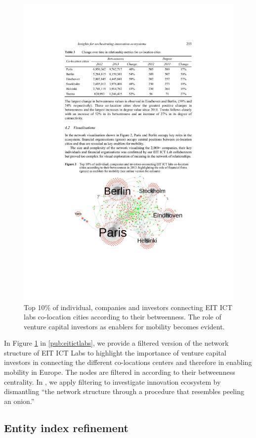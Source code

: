 \begin{figure}[htb]
\centering
\includegraphics[width=12cm]{figure/eitictlabs-top10percent.pdf}
\caption{Top 10\% of individual, companies and investors connecting EIT ICT labs co-location cities according to their betweenness. The role of venture capital investors as enablers for mobility becomes evident.}
\label{fig:eitictlabs-top10percent}
\end{figure}

In Figure \ref{fig:eitictlabs-top10percent} in \ref{pub:eitictlabs}, we provide a filtered version of the network structure of EIT ICT Labs to highlight the importance of venture capital investors in connecting the different co-locations centers and therefore in enabling mobility in Europe. The nodes are filtered in according to their betweenness centrality. In \cite{Jarvi2016DismantlingLinkages}, we apply filtering to investigate innovation ecosystem by dismantling ``the network structure through a procedure that resembles peeling an onion.'' 

\subsection{Entity index refinement}

